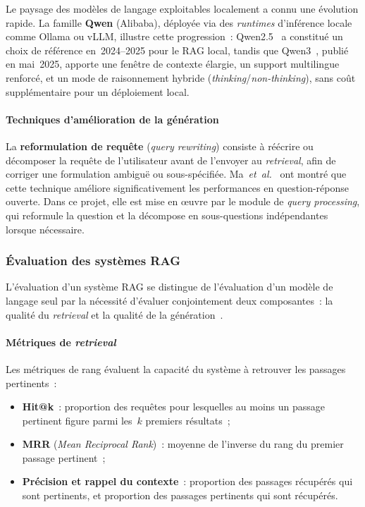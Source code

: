 \documentclass[11pt,a4paper]{article}
\begin{document}
Le paysage des modèles de langage exploitables localement a connu une évolution rapide. La famille \textbf{Qwen} (Alibaba), déployée via des \textit{runtimes} d'inférence locale comme Ollama ou vLLM, illustre cette progression~: Qwen2.5~\cite{qwen2024qwen25} a constitué un choix de référence en~2024--2025 pour le RAG local, tandis que Qwen3~\cite{qwen2025qwen3}, publié en mai~2025, apporte une fenêtre de contexte élargie, un support multilingue renforcé, et un mode de raisonnement hybride (\textit{thinking}/\textit{non-thinking}), sans coût supplémentaire pour un déploiement local.

\paragraph{Techniques d'amélioration de la génération}

La \textbf{reformulation de requête} (\textit{query rewriting}) consiste à réécrire ou décomposer la requête de l'utilisateur avant de l'envoyer au \textit{retrieval}, afin de corriger une formulation ambiguë ou sous-spécifiée. Ma~\textit{et~al.}~\cite{ma2023queryrewriting} ont montré que cette technique améliore significativement les performances en question-réponse ouverte. Dans ce projet, elle est mise en \oe{}uvre par le module de \textit{query processing}, qui reformule la question et la décompose en sous-questions indépendantes lorsque nécessaire. 

\subsubsection{Évaluation des systèmes RAG}

L'évaluation d'un système RAG se distingue de l'évaluation d'un modèle de langage seul par la nécessité d'évaluer conjointement deux composantes~: la qualité du \textit{retrieval} et la qualité de la génération~\cite{es2024ragas}.

\paragraph{Métriques de \textit{retrieval}}

Les métriques de rang évaluent la capacité du système à retrouver les passages pertinents~:
\begin{itemize}
  \item \textbf{Hit@k}~: proportion des requêtes pour lesquelles au moins un passage pertinent figure parmi les~$k$ premiers résultats~;
  \item \textbf{MRR} (\textit{Mean Reciprocal Rank})~: moyenne de l'inverse du rang du premier passage pertinent~;
  \item \textbf{Précision et rappel du contexte}~: proportion des passages récupérés qui sont pertinents, et proportion des passages pertinents qui sont récupérés.
\end{itemize}
\end{document}
